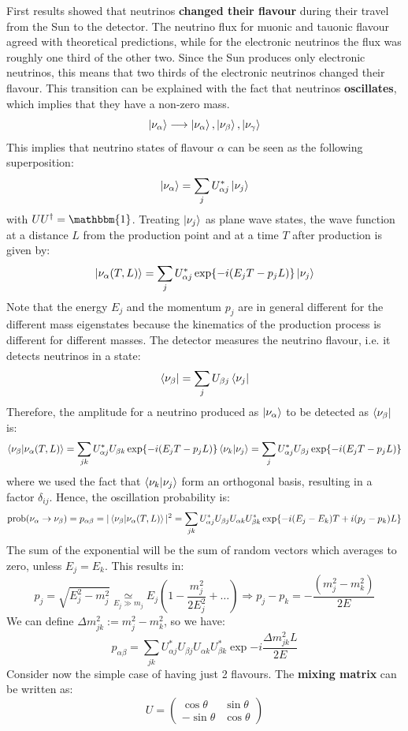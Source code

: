 \documentclass[10.75pt,a4paper,openright,bottom=2cm]{article}
\begin{document}
First results showed that neutrinos \textbf{changed their flavour} during their travel from the Sun to the detector. The neutrino flux for muonic and tauonic flavour agreed with theoretical predictions, while for the electronic neutrinos the flux was roughly one third of the other two. Since the Sun produces only electronic neutrinos, this means that two thirds of the electronic neutrinos changed their flavour. This transition can be explained with the fact that neutrinos \textbf{oscillates}, which implies that they have a non-zero mass.
\[
\ket{\nu_\alpha}\longrightarrow\ket{\nu_\alpha},\ket{\nu_\beta},\ket{\nu_\gamma}
\]
This implies that neutrino states of flavour $\alpha$ can be seen as the following superposition:
\[
\ket{\nu_\alpha}=\sum_jU_{\alpha j}^*\ket{\nu_j}
\]
with $UU^\dagger=\mathbbm{1}$. Treating $\ket{\nu_j}$ as plane wave states, the wave function at a distance
$L$ from the production point and at a time $T$ after production is given by:
\[
\ket{\nu_\alpha(T,L)}=\sum_jU^*_{\alpha j}\exp{-i(E_jT-p_jL)}\ket{\nu_j}
\]
Note that the energy $E_j$ and the momentum $p_j$ are in general different for the different
mass eigenstates because the kinematics of the production process is different for different
masses. The detector measures the neutrino flavour, i.e. it detects neutrinos in a state:
\[
\bra{\nu_\beta}=\sum_jU_{\beta j}\bra{\nu_j}
\]
Therefore, the amplitude for a neutrino produced as $\ket{\nu_\alpha}$ to be detected as $\bra{\nu_\beta}$ is:
\[
\braket{\nu_\beta}{\nu_\alpha(T,L)}=\sum_{jk}U_{\alpha j}^*U_{\beta k}\exp{-i(E_jT-p_jL)}\braket{\nu_k}{\nu_j}=\sum_jU_{\alpha j}^*U_{\beta j}\exp{-i(E_jT-p_jL)}
\]
where we used the fact that $\braket{\nu_k}{\nu_j}$ form an orthogonal basis, resulting in a factor $\delta_{ij}$. Hence, the oscillation probability is:
\[
\text{prob}(\nu_\alpha\to\nu_\beta)=p_{\alpha\beta}=|\braket{\nu_\beta}{\nu_\alpha(T,L)}|^2=\sum_{jk}U_{\alpha j}^*U_{\beta j}U_{\alpha k}U_{\beta k}^*\exp{-i(E_j-E_k)T+i(p_j-p_k)L}
\]
The sum of the exponential will be the sum of random vectors which averages to zero, unless $E_j=E_k$. This results in:
\[
p_j=\sqrt{E_j^2-m_j^2}\underset{E_j\gg m_j}{\simeq}E_j\left(1-\frac{m_j^2}{2E_j^2}+\dots\right)\Rightarrow p_j-p_k=-\frac{(m_j^2-m_k^2)}{2E}
\]
We can define $\Delta m_{jk}^2:=m_j^2-m_k^2$, so we have:
\[
p_{\alpha\beta}=\sum_{jk}U_{\alpha j}^*U_{\beta j}U_{\alpha k}U_{\beta k}^*\exp{-i\frac{\Delta m_{jk}^2L}{2E}}
\]
Consider now the simple case of having just 2 flavours. The \textbf{mixing matrix} can be written as:
\[
U=\left(\begin{array}{cc}
    \cos\theta & \sin\theta \\
    -\sin\theta & \cos\theta
\end{array}\right)
\]
\end{document}
